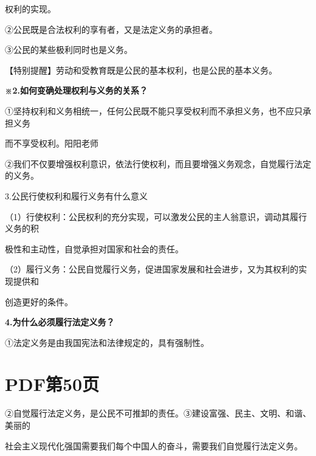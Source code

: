 \documentclass[lang=cn,11pt]{elegantbook}
\newcommand{\daofasym}[1]{{\daofasymbolfont #1}}
\newcommand{\daofasym}[1]{#1}
\begin{document}
权利的实现。\par

\daofasym{②}公民既是合法权利的享有者，又是法定义务的承担者。\par

\daofasym{③}公民的某些极利同时也是义务。\par

【特别提醒】劳动和受教育既是公民的基本权利，也是公民的基本义务。\par

\textbf{※2.如何变确处理权利与义务的关系？}\par

\daofasym{①}坚持权利和义务相统一，任何公民既不能只享受权利而不承担义务，也不应只承担义务\par

而不享受权利。阳阳老师\par

\daofasym{②}我们不仅要增强权利意识，依法行使权利，而且要增强义务观念，自觉履行法定的义务。\par

3.公民行使权利和履行义务有什么意义\par

（1）行使权利：公民权利的充分实现，可以激发公民的主人翁意识，调动其履行义务的积\par

极性和主动性，自觉承担对国家和社会的责任。\par

（2）履行义务：公民自觉履行义务，促进国家发展和社会进步，又为其权利的实现提供和\par

创造更好的条件。\par

\textbf{4.为什么必须履行法定义务？}\par

\daofasym{①}法定义务是由我国宪法和法律规定的，具有强制性。\par


\section*{PDF第50页}

\daofasym{②}自觉履行法定义务，是公民不可推卸的责任。\daofasym{③}建设富强、民主、文明、和谐、美丽的\par

社会主义现代化强国需要我们每个中国人的奋斗，需要我们自觉履行法定义务。\par
\end{document}

